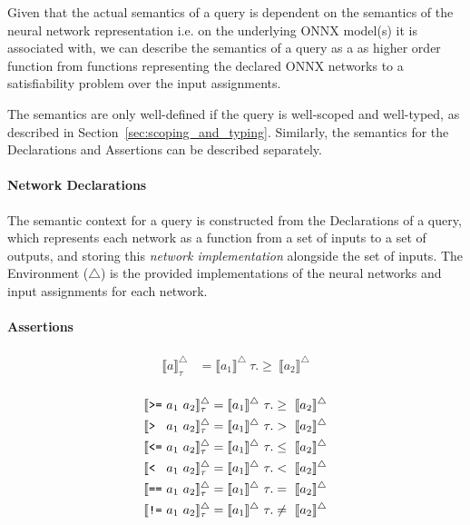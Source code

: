 Given that the actual semantics of a \vnnlib{} query is dependent on the semantics of the neural network representation i.e. on the underlying ONNX model(s) it is associated with, we can describe the semantics of a query as a as higher order function from functions representing the declared ONNX networks to a satisfiability problem over the input assignments. 

The semantics are only well-defined if the query is well-scoped and well-typed, as described in Section~\ref{sec:scoping_and_typing}. Similarly, the semantics for the Declarations and Assertions can be described separately.


\paragraph{Network Declarations}
The semantic context for a \vnnlib query is constructed from the Declarations of a \vnnlib{} query, which represents each network as a function from a set of inputs to a set of outputs, and storing this \textit{network implementation} alongside the set of inputs.
The Environment ($\triangle$) is the provided implementations of the neural networks and input assignments for each network.

\paragraph{Assertions}

\begin{align}
    \llbracket a \rrbracket_{\tau}^{\triangle} &= \llbracket a_1 \rrbracket^{\triangle}~\tau.\geq~\llbracket a_2 \rrbracket^{\triangle}\\
\end{align}

\begin{align}
    \llbracket \text{\texttt{>=}}~a_1~a_2 \rrbracket_{\tau}^{\triangle} &= \llbracket a_1 \rrbracket^{\triangle}~\tau.\geq~\llbracket a_2 \rrbracket^{\triangle}\\
    \llbracket \text{\texttt{> }}~a_1~a_2 \rrbracket_{\tau}^{\triangle} &= \llbracket a_1 \rrbracket^{\triangle}~\tau.>~\llbracket a_2 \rrbracket^{\triangle}\\
    \llbracket \text{\texttt{<=}}~a_1~a_2 \rrbracket_{\tau}^{\triangle} &= \llbracket a_1 \rrbracket^{\triangle}~\tau.\leq~\llbracket a_2 \rrbracket^{\triangle}\\
    \llbracket \text{\texttt{< }}~a_1~a_2 \rrbracket_{\tau}^{\triangle} &= \llbracket a_1 \rrbracket^{\triangle}~\tau.<~\llbracket a_2 \rrbracket^{\triangle}\\
    \llbracket \text{\texttt{==}}~a_1~a_2 \rrbracket_{\tau}^{\triangle} &= \llbracket a_1 \rrbracket^{\triangle}~\tau.=~\llbracket a_2 \rrbracket^{\triangle}\\
    \llbracket \text{\texttt{!=}}~a_1~a_2 \rrbracket_{\tau}^{\triangle} &= \llbracket a_1 \rrbracket^{\triangle}~\tau.\neq~\llbracket a_2 \rrbracket^{\triangle}
\end{align}

